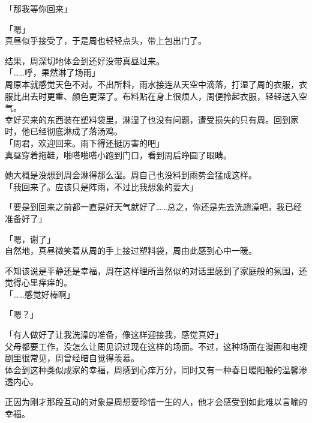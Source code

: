「那我等你回来」

「嗯」\\

真昼似乎接受了，于是周也轻轻点头，带上包出门了。\\

\vspace{2\baselineskip}

结果，周深切地体会到还好没带真昼过来。\\

「……呼，果然淋了场雨」\\

周原本就感觉天色不对。不出所料，雨水接连从天空中滴落，打湿了周的衣服，衣服比出去时更重、颜色更深了。布料贴在身上很烦人，周便拎起衣服，轻轻送入空气。\\

幸好买来的东西装在塑料袋里，淋湿了也没有问题，遭受损失的只有周。回到家时，他已经彻底淋成了落汤鸡。\\

「周君，欢迎回来。雨下得还挺厉害的吧」\\

真昼穿着拖鞋，啪嗒啪嗒小跑到门口，看到周后睁圆了眼睛。

她大概是没想到周会淋得那么湿。周自己也没料到雨势会猛成这样。\\

「我回来了。应该只是阵雨，不过比我想象的要大」

「要是到回来之前都一直是好天气就好了……总之，你还是先去洗趟澡吧，我已经准备好了」

「嗯，谢了」\\

自然地，真昼微笑着从周的手上接过塑料袋，周由此感到心中一暖。

不知该说是平静还是幸福，周在这样理所当然似的对话里感到了家庭般的氛围，还觉得心里痒痒的。\\

「……感觉好棒啊」

「嗯？」

「有人做好了让我洗澡的准备，像这样迎接我，感觉真好」\\

父母都要工作，没怎么让周见识过现在这样的场面。不过，这种场面在漫画和电视剧里很常见，周曾经暗自觉得羡慕。\\

体会到这种类似成家的幸福，周感到心痒万分，同时又有一种春日暖阳般的温馨渗透内心。

正因为刚才那段互动的对象是周想要珍惜一生的人，他才会感受到如此难以言喻的幸福。\\

